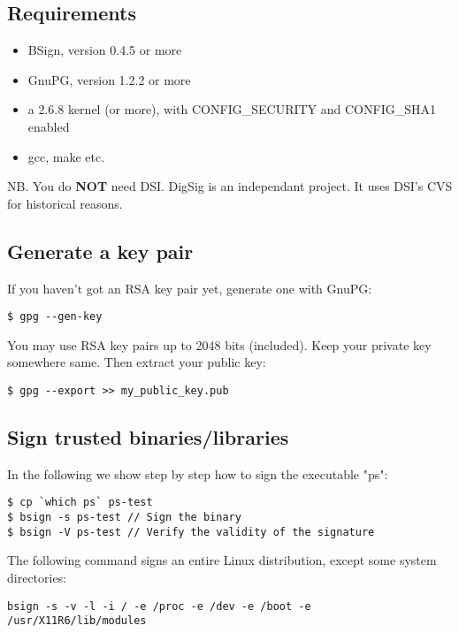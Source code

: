\documentclass{article}
\begin{document}
\subsection{Requirements}
\label{sec:requirements}

\begin{itemize}
\item BSign, version 0.4.5 or more \cite{Bsign}
\item GnuPG, version 1.2.2 or more \cite{GnuPG}
\item a 2.6.8 kernel (or more), with CONFIG\_SECURITY and CONFIG\_SHA1
enabled
\item gcc, make etc.
\end{itemize}

NB. You do {\bf NOT} need DSI. DigSig is an independant project. It uses DSI's CVS for historical reasons.

\subsection{Generate a key pair}
\label{sec:generate}
If you haven't got an RSA key pair yet, generate one with GnuPG:
\small
\begin{verbatim}
$ gpg --gen-key
\end{verbatim}
\normalsize

You may use RSA key pairs up to 2048 bits (included).
Keep your private key somewhere same. Then extract your public key:
\small
\begin{verbatim} 
$ gpg --export >> my_public_key.pub 
\end{verbatim}
\normalsize

\subsection{Sign trusted binaries/libraries}
\label{sec:sign-bin}

In the following we show step by step how to sign the executable "ps":

\small
\begin{verbatim} 
$ cp `which ps` ps-test
$ bsign -s ps-test // Sign the binary
$ bsign -V ps-test // Verify the validity of the signature 
\end{verbatim} 
\normalsize

The following command signs an entire Linux distribution, except
some system directories:

\small
\begin{verbatim}
bsign -s -v -l -i / -e /proc -e /dev -e /boot -e /usr/X11R6/lib/modules
\end{verbatim}
\normalsize
\end{document}
